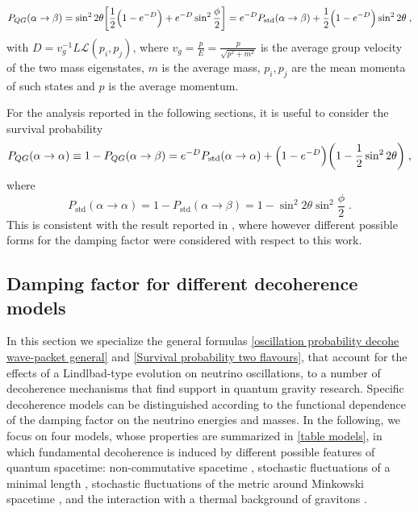 \documentclass[11pt]{article}
\begin{document}
\begin{equation}\label{Probability decoherence two flavour}
    P_{QG}(\alpha\to\beta) =  \sin^2{2\theta}\qty[\frac{1}{2}\qty(1-e^{-D})+e^{-D}\sin^2{\frac{\phi}{2}}] = e^{-D} P_{\text{std}}(\alpha\to\beta)+\frac{1}{2}\qty(1-e^{-D})\sin^2{2\theta}\;,
\end{equation}
with $D= v_g^{-1}L\mathcal{L}(p_i,p_j)$, where $v_g = \frac{p}{E} = \frac{p}{\sqrt{p^2+m^2}}$ is the average group velocity of the two mass eigenstates, $m$ is the average mass, $p_i,p_j$ are the mean momenta of such states and $p$ is the average momentum.

For the analysis reported in the following sections, it is useful to consider the survival probability 
\begin{equation}\label{Survival probability two flavours}
    P_{QG}(\alpha\to\alpha) \equiv 1- P_{QG}(\alpha\to\beta)= e^{-D} P_{\text{std}}(\alpha\to\alpha) + \qty(1-e^{-D})\qty(1-\frac{1}{2}\sin^2 2\theta)\;,
\end{equation}
where
\begin{equation}\label{standard survival}
    P_{\text{std}}(\alpha\to\alpha) = 1 - P_{\text{std}}(\alpha\to\beta) = 1-\sin^2{2\theta}\sin^2{\frac{\phi}{2}}\;.
\end{equation}
This is consistent with the result reported in \cite{Lisi:2000zt}, where however different possible forms for the damping factor were considered with respect to this work.


\subsection{Damping factor for different decoherence models}\label{decoherence models}

In this section we specialize the general formulas \eqref{oscillation probability decohe wave-packet general} and \eqref{Survival probability two flavours}, that account for the effects of a Lindlbad-type evolution on neutrino oscillations, 
to a number of decoherence mechanisms that find support in quantum gravity research. Specific decoherence models can be distinguished according to the functional dependence of the damping factor on the neutrino energies and masses.
In the following, we focus on four models, whose properties are summarized in \cref{table models}, in which fundamental decoherence is induced by different possible features of quantum spacetime: non-commutative spacetime \cite{Arzano:2022nlo}, stochastic fluctuations of a minimal length \cite{Petruzziello:2020wkd}, stochastic fluctuations of the metric around Minkowski spacetime \cite{Breuer:2008rh}, and the interaction with a thermal background of gravitons \cite{Blencowe:2012mp}. 
\end{document}
